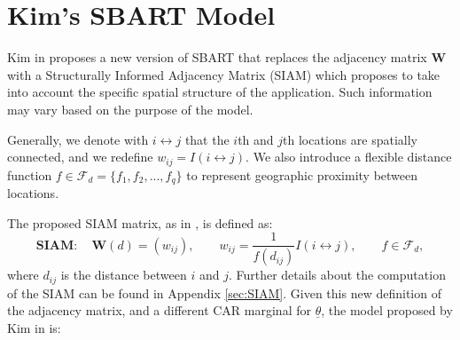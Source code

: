 \documentclass[11pt,a4paper]{article}
\newcommand{\mat}[1]{\mathbf{#1}}
\newcommand{\vect}[1]{\underline{#1}}
\begin{document}
\section{Kim's SBART Model}
\label{sec:KimSBARTmodel}
Kim in \cite{Kim_2022} proposes a new version of SBART that replaces the adjacency matrix $\mat{W}$ with a Structurally Informed Adjacency Matrix (SIAM) which proposes to take into account the specific spatial structure of the application. Such information may vary based on the purpose of the model.

Generally, we denote with $i \leftrightarrow j$ that the $i$th and $j$th locations are spatially connected, and we redefine $w_{ij} = I(i \leftrightarrow j)$. We also introduce a flexible distance function $f \in \mathcal{F}_d = \{f_1, f_2, ... , f_q\}$ to represent geographic proximity between locations.

The proposed SIAM matrix, as in \cite{Kim_2022}, is defined as:
\begin{equation}
    \label{eq:SIAM}
    \mat{SIAM}: \quad \mat{W}(d) = (w_{ij}), \qquad w_{ij} = \frac{1}{f(d_{ij})}I(i \leftrightarrow j), \qquad f \in \mathcal{F}_d,
\end{equation}
where $d_{ij}$ is the distance between $i$ and $j$.
Further details about the computation of the SIAM can be found in Appendix \ref{sec:SIAM}.
Given this new definition of the adjacency matrix, and a different CAR marginal for $\vect{\theta}$, the model proposed by Kim in \cite{Kim_2022} is:
\end{document}
